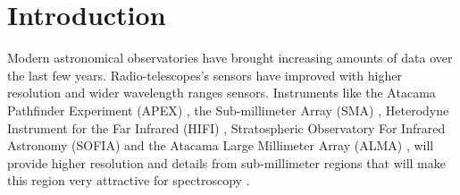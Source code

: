 \section{Introduction} \label{sec:intro}

Modern astronomical observatories have brought increasing amounts of data over the last few years.
Radio-telescopes's sensors have improved with higher resolution and wider wavelength ranges sensors.
Instruments like the Atacama Pathfinder Experiment (APEX) \citep{gusten_apex},
the Sub-millimeter Array (SMA) \citep{ho_submillimeter_2004},
Heterodyne Instrument for the Far Infrared (HIFI) \citep{de_graauw_herschel},
Stratospheric Observatory For Infrared Astronomy (SOFIA) \citep{becklin_stratospheric_2005}
and the Atacama Large Millimeter Array (ALMA) \cite{},
will provide higher resolution and details from sub-millimeter regions that will make this region very attractive for spectroscopy
\citep{schilke_line_2001, muller_cologne_2005, schilke_analysis_2011}.

